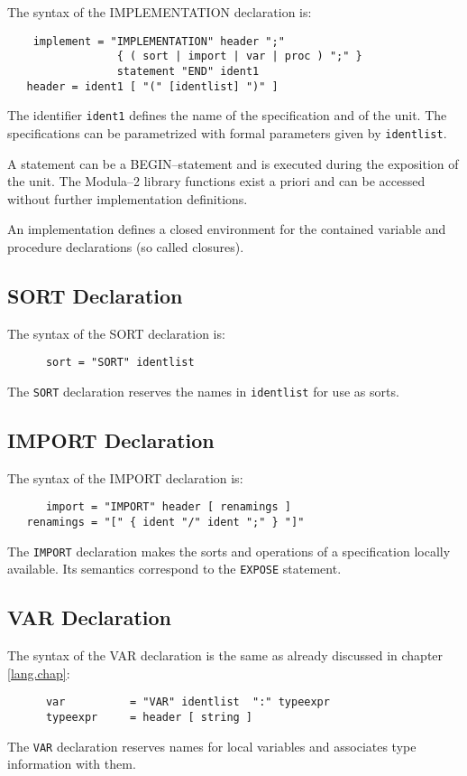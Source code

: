 The syntax of the IMPLEMENTATION declaration is:
\begin{verbatim}
    implement = "IMPLEMENTATION" header ";" 
                 { ( sort | import | var | proc ) ";" } 
                 statement "END" ident1
   header = ident1 [ "(" [identlist] ")" ]
\end{verbatim}
The identifier \verb/ident1/ defines the name 
of the specification and of the unit.
The specifications can be parametrized 
with formal parameters given by \verb/identlist/.  

A statement can be a BEGIN--statement and is executed 
during the exposition of the unit.
The Modula--2 library functions exist a priori and 
can be accessed without further implementation definitions.

An implementation defines a closed environment 
for the contained variable and procedure declarations 
(so called closures).

\subsection{SORT Declaration}

The syntax of the SORT declaration is:
\begin{verbatim}
      sort = "SORT" identlist   
\end{verbatim}
The \verb/SORT/ declaration reserves the names 
in \verb/identlist/ for use as sorts.

\subsection{IMPORT Declaration}

The syntax of the IMPORT declaration is:
\begin{verbatim}
      import = "IMPORT" header [ renamings ]   
   renamings = "[" { ident "/" ident ";" } "]"
\end{verbatim}
The \verb/IMPORT/ declaration 
makes the sorts and operations of a specification 
locally available. Its semantics correspond to the 
\verb/EXPOSE/ statement.

\subsection{VAR Declaration}

The syntax of the VAR declaration is the same as already 
discussed in chapter \ref{lang.chap}:
\begin{verbatim}
      var          = "VAR" identlist  ":" typeexpr  
      typeexpr     = header [ string ]
\end{verbatim}
The \verb/VAR/ declaration reserves names for 
local variables and associates type information with them. 

